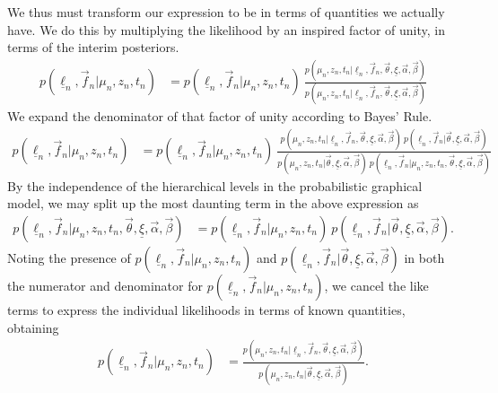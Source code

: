 \documentclass[12pt, onecolumn]{emulateapj}
\newcommand{\textul}{\underline}
\begin{document}
We thus must transform our expression to be in terms of quantities we actually have.  We do this by multiplying the likelihood by an inspired factor of unity, in terms of the interim posteriors.
\begin{align}
\label{eq:unity}
p(\textul{\ell}_{n}, \vec{f}_{n} | \mu_{n}, z_{n}, t_{n}) &= p(\textul{\ell}_{n}, \vec{f}_{n} | \mu_{n}, z_{n}, t_{n})\ \frac{p(\mu_{n}, z_{n}, t_{n} | \textul{\ell}_{n}, \vec{f}_{n},\vec{\theta}, \textul{\xi}, \vec{\alpha}, \vec{\beta})}{p(\mu_{n}, z_{n}, t_{n} | \textul{\ell}_{n}, \vec{f}_{n}, \vec{\theta}, \textul{\xi}, \vec{\alpha}, \vec{\beta})}
\end{align}
We expand the denominator of that factor of unity according to Bayes' Rule.
\begin{align}
\label{eq:expand}
p(\textul{\ell}_{n}, \vec{f}_{n} | \mu_{n}, z_{n}, t_{n}) &= p(\textul{\ell}_{n}, \vec{f}_{n} | \mu_{n}, z_{n}, t_{n})\ \frac{p(\mu_{n}, z_{n}, t_{n} | \textul{\ell}_{n}, \vec{f}_{n},\vec{\theta}, \textul{\xi}, \vec{\alpha}, \vec{\beta})\ p(\textul{\ell}_{n}, \vec{f}_{n} | \vec{\theta}, \textul{\xi}, \vec{\alpha}, \vec{\beta})}{p(\mu_{n}, z_{n}, t_{n} | \vec{\theta}, \textul{\xi}, \vec{\alpha}, \vec{\beta})\ p(\textul{\ell}_{n}, \vec{f}_{n} | \mu_{n}, z_{n}, t_{n}, \vec{\theta}, \textul{\xi}, \vec{\alpha}, \vec{\beta})}
\end{align}
By the independence of the hierarchical levels in the probabilistic graphical model, we may split up the most daunting term in the above expression as
\begin{align}
\label{eq:breakdown}
p(\textul{\ell}_{n}, \vec{f}_{n} | \mu_{n}, z_{n}, t_{n}, \vec{\theta}, \textul{\xi}, \vec{\alpha}, \vec{\beta}) &= p(\textul{\ell}_{n}, \vec{f}_{n} | \mu_{n}, z_{n}, t_{n})\ p(\textul{\ell}_{n}, \vec{f}_{n} | \vec{\theta}, \textul{\xi}, \vec{\alpha}, \vec{\beta}).
\end{align}
Noting the presence of $p(\textul{\ell}_{n}, \vec{f}_{n} | \mu_{n}, z_{n}, t_{n})$ and $p(\textul{\ell}_{n}, \vec{f}_{n} | \vec{\theta}, \textul{\xi}, \vec{\alpha}, \vec{\beta})$ in both the numerator and denominator for $p(\textul{\ell}_{n}, \vec{f}_{n} | \mu_{n}, z_{n}, t_{n})$, we cancel the like terms to express the individual likelihoods in terms of known quantities, obtaining
\begin{align}
\label{eq:cancellation}
p(\textul{\ell}_{n}, \vec{f}_{n} | \mu_{n}, z_{n}, t_{n}) &= \frac{p(\mu_{n}, z_{n}, t_{n} | \textul{\ell}_{n}, \vec{f}_{n}, \vec{\theta}, \textul{\xi}, \vec{\alpha}, \vec{\beta})}{p(\mu_{n}, z_{n}, t_{n} | \vec{\theta}, \textul{\xi}, \vec{\alpha}, \vec{\beta})}.
\end{align}
\end{document}
